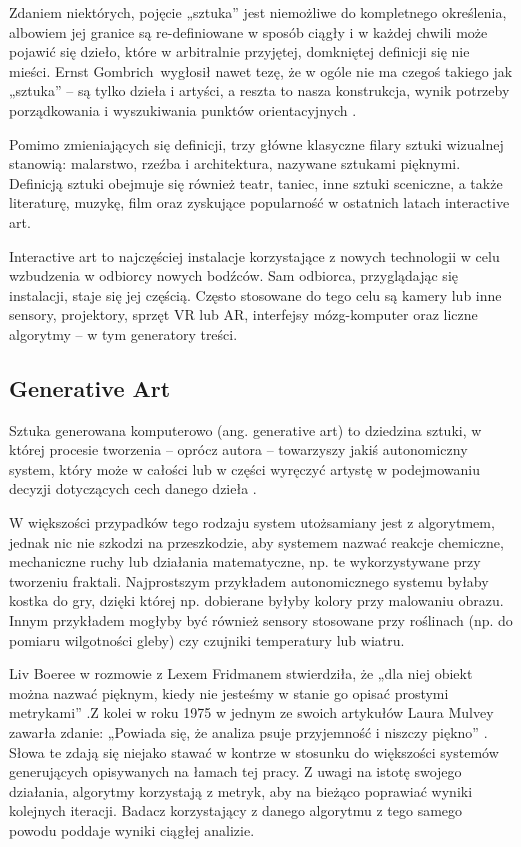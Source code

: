 \documentclass[12pt]{article}
\begin{document}
Zdaniem niektórych, pojęcie „sztuka” jest niemożliwe do kompletnego określenia, albowiem jej granice są re-definiowane w sposób ciągły i w każdej chwili może pojawić się dzieło, które w arbitralnie przyjętej, domkniętej definicji się nie mieści. Ernst Gombrich wygłosił nawet tezę, że w ogóle nie ma czegoś takiego jak „sztuka” – są tylko dzieła i artyści, a reszta to nasza konstrukcja, wynik potrzeby porządkowania i wyszukiwania punktów orientacyjnych \cite{14}.

Pomimo zmieniających się definicji, trzy główne klasyczne filary sztuki wizualnej stanowią: malarstwo, rzeźba i architektura, nazywane sztukami pięknymi. Definicją sztuki obejmuje się również teatr, taniec, inne sztuki sceniczne, a także literaturę, muzykę, film oraz zyskujące popularność w ostatnich latach interactive art.

Interactive art to najczęściej instalacje korzystające z nowych technologii w celu wzbudzenia w odbiorcy nowych bodźców. Sam odbiorca, przyglądając się instalacji, staje się jej częścią. Często stosowane do tego celu są kamery lub inne sensory, projektory, sprzęt VR lub AR, interfejsy mózg-komputer oraz liczne algorytmy – w tym generatory treści.

\subsection{Generative Art}

\indent

Sztuka generowana komputerowo (ang. generative art) to dziedzina sztuki, w której procesie tworzenia – oprócz autora – towarzyszy jakiś autonomiczny system, który może w całości lub w części wyręczyć artystę w podejmowaniu decyzji dotyczących cech danego dzieła \cite{2}.

W większości przypadków tego rodzaju system utożsamiany jest z algorytmem, jednak nic nie szkodzi na przeszkodzie, aby systemem nazwać reakcje chemiczne, mechaniczne ruchy lub działania matematyczne, np. te wykorzystywane przy tworzeniu fraktali. Najprostszym przykładem autonomicznego systemu byłaby kostka do gry, dzięki której np. dobierane byłyby kolory przy malowaniu obrazu. Innym przykładem mogłyby być również sensory stosowane przy roślinach (np. do pomiaru wilgotności gleby) czy czujniki temperatury lub wiatru.

Liv Boeree w rozmowie z Lexem Fridmanem stwierdziła, że „dla niej obiekt można nazwać pięknym, kiedy nie jesteśmy w stanie go opisać prostymi metrykami” \cite{59}.Z kolei w roku 1975 w jednym ze swoich artykułów Laura Mulvey zawarła zdanie: „Powiada się, że analiza psuje przyjemność i niszczy piękno” \cite{60}. Słowa te zdają się niejako stawać w kontrze w stosunku do większości systemów generujących opisywanych na łamach tej pracy. Z uwagi na istotę swojego działania, algorytmy korzystają z metryk, aby na bieżąco poprawiać wyniki kolejnych iteracji. Badacz korzystający z danego algorytmu z tego samego powodu poddaje wyniki ciągłej analizie.
\end{document}
